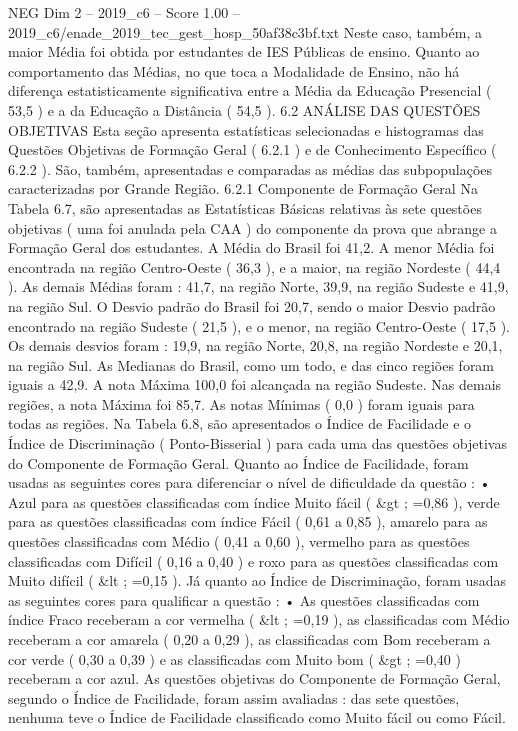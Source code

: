 \begin{textsample}{NEG Dim 2 – 2019\_c6 – Score 1.00 – 2019\_c6/enade\_2019\_tec\_gest\_hosp\_50af38c3bf.txt}
Neste caso, também, a maior Média foi obtida por estudantes de IES Públicas de ensino.
Quanto ao comportamento das Médias, no que toca a Modalidade de Ensino, não há diferença estatisticamente significativa entre a Média da Educação Presencial ( 53,5 ) e a da Educação a Distância ( 54,5 ). 6.2 ANÁLISE DAS QUESTÕES OBJETIVAS Esta seção apresenta estatísticas selecionadas e histogramas das Questões Objetivas de Formação Geral ( 6.2.1 ) e de Conhecimento Específico ( 6.2.2 ).
São, também, apresentadas e comparadas as médias das subpopulações caracterizadas por Grande Região. 6.2.1 Componente de Formação Geral Na Tabela 6.7, são apresentadas as Estatísticas Básicas relativas às sete questões objetivas ( uma foi anulada pela CAA ) do componente da prova que abrange a Formação Geral dos estudantes.
A Média do Brasil foi 41,2.
A menor Média foi encontrada na região Centro-Oeste ( 36,3 ), e a maior, na região Nordeste ( 44,4 ).
As demais Médias foram : 41,7, na região Norte, 39,9, na região Sudeste e 41,9, na região Sul.
O Desvio padrão do Brasil foi 20,7, sendo o maior Desvio padrão encontrado na região Sudeste ( 21,5 ), e o menor, na região Centro-Oeste ( 17,5 ).
Os demais desvios foram : 19,9, na região Norte, 20,8, na região Nordeste e 20,1, na região Sul.
As Medianas do Brasil, como um todo, e das cinco regiões foram iguais a 42,9.
A nota Máxima 100,0 foi alcançada na região Sudeste.
Nas demais regiões, a nota Máxima foi 85,7.
As notas Mínimas ( 0,0 ) foram iguais para todas as regiões.
Na Tabela 6.8, são apresentados o Índice de Facilidade e o Índice de Discriminação ( Ponto-Bisserial ) para cada uma das questões objetivas do Componente de Formação Geral.
Quanto ao Índice de Facilidade, foram usadas as seguintes cores para diferenciar o nível de dificuldade da questão : • Azul para as questões classificadas com índice Muito fácil ( \&gt ; =0,86 ), verde para as questões classificadas com índice Fácil ( 0,61 a 0,85 ), amarelo para as questões classificadas com Médio ( 0,41 a 0,60 ), vermelho para as questões classificadas com Difícil ( 0,16 a 0,40 ) e roxo para as questões classificadas com Muito difícil ( \&lt ; =0,15 ).
Já quanto ao Índice de Discriminação, foram usadas as seguintes cores para qualificar a questão : • As questões classificadas com índice Fraco receberam a cor vermelha ( \&lt ; =0,19 ), as classificadas com Médio receberam a cor amarela ( 0,20 a 0,29 ), as classificadas com Bom receberam a cor verde ( 0,30 a 0,39 ) e as classificadas com Muito bom ( \&gt ; =0,40 ) receberam a cor azul.
As questões objetivas do Componente de Formação Geral, segundo o Índice de Facilidade, foram assim avaliadas : das sete questões, nenhuma teve o Índice de Facilidade classificado como Muito fácil ou como Fácil.

\end{textsample}

